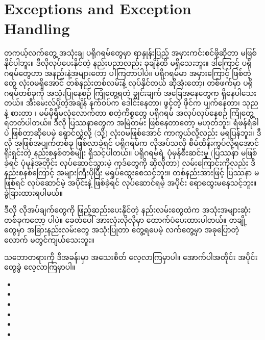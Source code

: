 \chapter{Exceptions and Exception Handling}

တကယ့်လက်တွေ့ အသုံးချ ပရိုဂရမ်တွေမှာ ရာနှုန်းပြည့် အမှားကင်းစင်ဖို့ဆိုတာ မဖြစ်နိုင်ပါဘူး။ ဒီလိုလုပ်ပေးနိုင်တဲ့ နည်းပညာလည်း ခုချိန်ထိ မရှိသေးဘူး။ ဒါကြောင့် ပရိုဂရမ်တွေဟာ  အနည်းနဲ့အများတော့ ပါကြတာပါပဲ။ ပရိုဂရမ်မာ အမှားကြောင့် ဖြစ်တဲ့  တွေ လုံးဝမရှိအောင် တစ်နည်းတစ်လမ်းနဲ့ လုပ်နိုင်တယ် ဆိုအုံးတော့၊ တစ်ဖက်မှာ ပရိုဂရမ်တစ်ခုကို အသုံးပြုနေစဉ်  ကြုံတွေ့ရတဲ့ ချွင်းချက် အခြေအနေတွေက ရှိနေပါသေးတယ်။ အီးမေးလ်ပို့တဲ့အချိန် နက်ဝပ်က ဒေါင်းနေတာ၊ ဖွင့်တဲ့ ဖိုင်က ပျက်နေတာ၊ သုညနဲ့ စားတာ ၊ မမ်မိုရီမလုံလောက်တာ စတဲ့ကိစ္စတွေ ပရိုဂရမ် အလုပ်လုပ်နေစဉ် ကြုံတွေ့ရတတ်ပါတယ်။ ဒီလို ပြဿနာတွေက အမြဲတမ်း ဖြစ်နေတာတော့ မဟုတ်ဘူး၊ ရံဖန်ရံခါပဲ ဖြစ်တာဆိုပေမဲ့ ရှောင်လွှဲလို့ (သို့) လုံးဝမဖြစ်အောင် ကာကွယ်လို့လည်း မရပြန်ဘူး။ ဒီလို အဖြစ်အပျက်တစ်ခု ဖြစ်လာခဲ့ရင် ပရိုဂရမ်က လိုအပ်သလို စီမံထိန်းကွပ်လို့ရအောင် ရိုးရှင်းတဲ့ နည်းစနစ်တစ်မျိုး ရှိသင့်ပါတယ်။ ပရိုဂရမ်ရဲ့ ပုံမှန်စီးဆင်းမှု (ပြဿနာ မဖြစ်ခဲ့ရင် ပုံမှန်အတိုင်း လုပ်ဆောင်သွားမဲ့ ကုဒ်တွေကို ဆိုလိုတာ) လမ်းကြောင်းကိုလည်း ဒီနည်းစနစ်ကြောင့် အများကြီးပိုပြီး မရှုပ်ထွေးစေသင့်ဘူး။ တစ်နည်းအားဖြင့် ပြဿနာ မဖြစ်ရင် လုပ်ဆောင်မဲ့ အပိုင်းနဲ့ ဖြစ်ခဲ့ရင် လုပ်ဆောင်ရမဲ့ အပိုင်း ရောထွေးမနေသင့်ဘူး။ ခွဲခြားထားရပါမယ်။

ဒီလို လိုအပ်ချက်တွေကို ဖြည့်ဆည်းပေးနိုင်တဲ့ နည်းလမ်းတွေထဲက အသုံးအများဆုံး တစ်ခုကတော့   ပါပဲ။ ခေတ်ပေါ်  အားလုံးလိုလိုမှာ  ထောက်ပံပေးထားပါတယ်။ တချို့  တွေမှာ အခြားနည်းလမ်းတွေ အသုံးပြုတာ တွေ့ရပေမဲ့ လက်တွေ့မှာ အခုပြောတဲ့  လောက် မတွင်ကျယ်သေးဘူး။ 

 သဘောတရားကို ဒီအခန်းမှာ အသေးစိတ် လေ့လာကြမှာပါ။ အောက်ပါအတိုင်း အပိုင်းတွေခွဲ လေ့လာကြမှာပါ။
%
\begin{itemize}
    \item {}
    \item {}
    \item {} 
    \item {}
    \item {}
    \item {}
\end{itemize}
%




